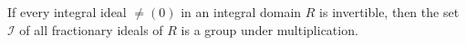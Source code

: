 If every integral ideal $\neq (0)$ in an integral domain $R$ is invertible, then the set $\mathcal{I}$ of all fractionary ideals of $R$ is a group under multiplication.
